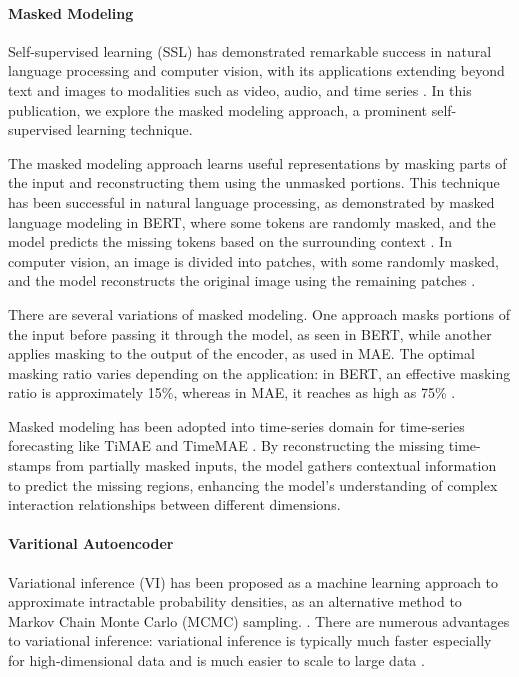 \documentclass[12pt]{article} %
\newcommand{\para}[1]{\vspace*{-4.5mm}\paragraph{#1}}
\begin{document}

\para{Masked Modeling}
Self-supervised learning (SSL) has demonstrated remarkable success in natural language processing and computer vision, with its applications extending beyond text and images to modalities such as video, audio, and time series \citep{balestriero2023cookbook}. In this publication, we explore the masked modeling approach, a prominent self-supervised learning technique.

The masked modeling approach learns useful representations by masking parts of the input and reconstructing them using the unmasked portions. This technique has been successful in natural language processing, as demonstrated by masked language modeling in BERT, where some tokens are randomly masked, and the model predicts the missing tokens based on the surrounding context \citep{devlin2019bert}. In computer vision, an image is divided into patches, with some randomly masked, and the model reconstructs the original image using the remaining patches \citep{he2022masked}.

There are several variations of masked modeling. One approach masks portions of the input before passing it through the model, as seen in BERT, while another applies masking to the output of the encoder, as used in MAE. The optimal masking ratio varies depending on the application: in BERT, an effective masking ratio is approximately 15\%, whereas in MAE, it reaches as high as 75\% \citep{yao2022masked}.

Masked modeling has been adopted into time-series domain for time-series forecasting like TiMAE and TimeMAE \citep{li2023ti}\citep{cheng2023timemae}. By reconstructing the missing time-stamps from partially masked inputs, the model gathers contextual information to predict the missing regions, enhancing the model's understanding of complex interaction relationships between different dimensions.

\para{Varitional Autoencoder}
Variational inference (VI) has been proposed as a machine learning approach to approximate intractable probability densities, as an alternative method to Markov Chain Monte Carlo (MCMC) sampling. \citep{jordan1999introduction}\citep{Blei_2017}. There are numerous advantages to variational inference: variational inference is typically much faster especially for high-dimensional data and is much easier to scale to large data \citep{Blei_2017}.
\end{document}
